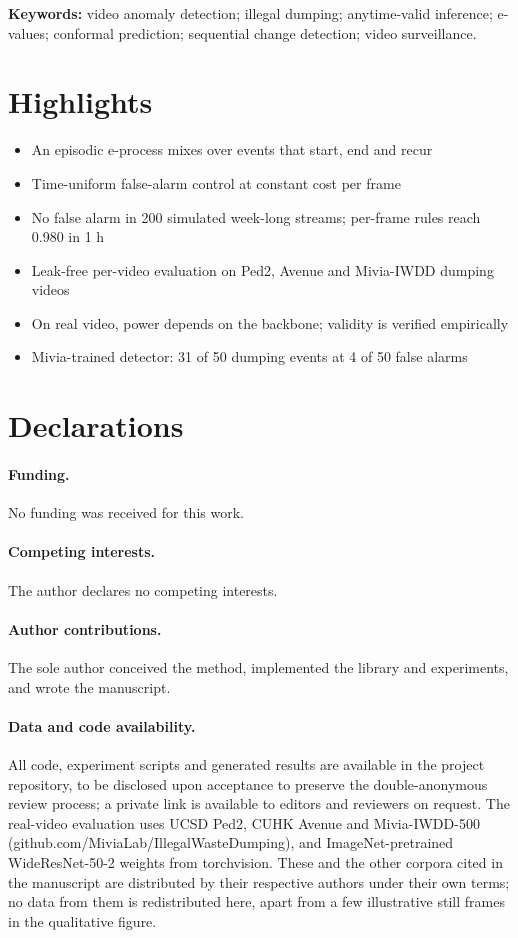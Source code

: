 \documentclass[11pt,a4paper]{article}
\begin{document}
\vspace{0.5em}
\noindent\textbf{Keywords:} video anomaly detection; illegal dumping; anytime-valid inference; e-values; conformal prediction; sequential change detection; video surveillance.

\section*{Highlights}
\begin{itemize}
  \item An episodic e-process mixes over events that start, end and recur
  \item Time-uniform false-alarm control at constant cost per frame
  \item No false alarm in 200 simulated week-long streams; per-frame rules reach 0.980 in 1 h
  \item Leak-free per-video evaluation on Ped2, Avenue and Mivia-IWDD dumping videos
  \item On real video, power depends on the backbone; validity is verified empirically
  \item Mivia-trained detector: 31 of 50 dumping events at 4 of 50 false alarms
\end{itemize}


\section*{Declarations}

\paragraph{Funding.} No funding was received for this work.
\paragraph{Competing interests.} The author declares no competing interests.
\paragraph{Author contributions.} The sole author conceived the method,
implemented the library and experiments, and wrote the manuscript.
\paragraph{Data and code availability.} All code, experiment scripts and
generated results are available in the project repository, to be disclosed
upon acceptance to preserve the double-anonymous review process; a private
link is available to editors and reviewers on request. The real-video evaluation
uses UCSD Ped2, CUHK Avenue and Mivia-IWDD-500
(github.com/MiviaLab/IllegalWasteDumping), and ImageNet-pretrained
WideResNet-50-2 weights from torchvision. These and the other corpora cited
in the manuscript are distributed by their respective authors under their own
terms; no data from them is redistributed here, apart from a few illustrative still frames in the qualitative figure.
\end{document}
